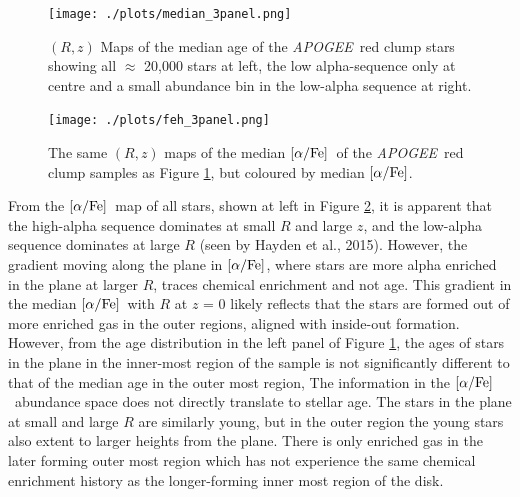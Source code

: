 \documentclass[12pt, preprint]{aastex}
\newcommand{\project}[1]{\textsl{#1}}
\newcommand{\apogee}{\project{APOGEE}}
\newcommand{\alphafe}{\mbox{$\rm [\alpha/Fe]$}}
\begin{document}
\begin{figure}[h!]
\centering
    \texttt{[image: ./plots/median\_3panel.png]}
    \caption{$(R,z)$ Maps of the median age of the  \apogee\ red clump stars showing all $\approx$ 20,000 stars at left, the low alpha-sequence only at centre and a small abundance bin in the low-alpha sequence at right.  }
\label{fig:redclump_age}
\end{figure}

\begin{figure}[h!]
\centering
    \texttt{[image: ./plots/feh\_3panel.png]}
    \caption{The same $(R,z)$ maps of the median \alphafe\ of the \apogee\ red clump samples as Figure \ref{fig:redclump_age}, but coloured by median \alphafe.}
\label{fig:redclump_alpha}
\end{figure}



From the \alphafe\ map of all stars, shown at left in Figure \ref{fig:redclump_alpha}, it is apparent that the high-alpha sequence dominates at small $R$ and large $z$, and the low-alpha sequence dominates at large $R$ (seen by Hayden et al., 2015). However, the gradient moving along the plane in \alphafe, where stars are more alpha enriched in the plane at larger $R$, traces chemical enrichment and not age. This gradient in the median \alphafe\ with $R$ at $z$ = 0 likely reflects that the stars are formed out of more enriched gas in the outer regions, aligned with inside-out formation. However, from the age distribution in the left panel of Figure \ref{fig:redclump_age}, the ages of stars in the plane in the inner-most region of the sample is not significantly different to that of the median age in the outer most region, The information in the \alphafe\ abundance space does not directly translate to stellar age. The stars in the plane at small and large $R$ are similarly young, but in the outer region the young stars also extent to larger heights from the plane. There is only enriched gas in the later forming outer most region which has not experience the same chemical enrichment history as the longer-forming inner most region of the disk.

 




\end{document}
